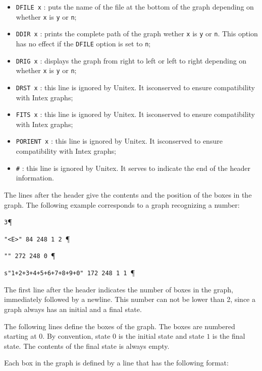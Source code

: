 \begin{itemize}
  \item \verb+DFILE x+ : puts the name of the file at the bottom of the graph
  depending on whether \verb+x+ is \verb+y+ or \verb+n+;

  \item \verb+DDIR x+ : prints the complete path of the graph wether \verb+x+ is
  \verb+y+ or \verb+n+. This option has no effect if the \verb+DFILE+ option is
  set to \verb+n+;

  \item \verb+DRIG x+ : displays the graph from right to left or left to right
  depending on whether \verb+x+ is \verb+y+ or \verb+n+;

  \item \verb+DRST x+ : this line is ignored by Unitex. It isconserved to ensure
  compatibility with Intex graphs;

  \item \verb+FITS x+ : this line is ignored by Unitex. It isconserved to ensure
  compatibility with Intex graphs;

  \item \verb+PORIENT x+ : this line is ignored by Unitex. It isconserved to
  ensure compatibility with Intex graphs;

  \item \verb+#+ : this line is ignored by Unitex. It serves to indicate the end
  of the header information.
\end{itemize}

\bigskip
\noindent The lines after the header give the contents and the position of the
boxes in the graph. The following example corresponds to a graph recognizing a
number:

\bigskip
\verb+3+\P

\verb+"<E>" 84 248 1 2 +\P

\verb+"" 272 248 0 +\P

\verb$s"1+2+3+4+5+6+7+8+9+0" 172 248 1 1 $\P

\bigskip
\noindent The first line after the header indicates the number of boxes in the
graph, immediately followed by a newline. This number can not be lower than 2,
since a graph always has an initial and a final state.

\bigskip
\noindent The following lines define the boxes of the graph. The boxes are numbered
starting at $0$. By convention, state $0$ is the initial state and state $1$ is
the final state. The contents of the final state is always empty.

\bigskip
\noindent Each box in the graph is defined by a line that has the
following format:

